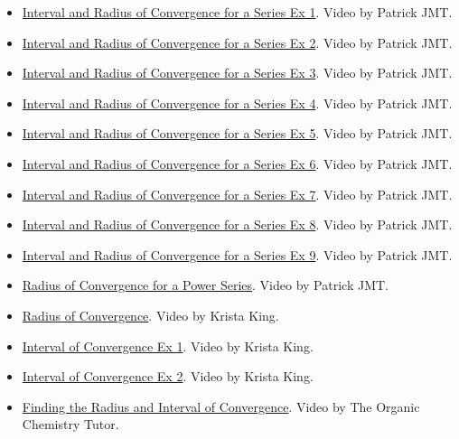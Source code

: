 \begin{itemize}

\item \href{https://www.youtube.com/watch?v=01LzAU__J-0}{Interval and Radius of Convergence for a Series Ex 1}. 
Video by Patrick JMT.

\item \href{https://www.youtube.com/watch?v=QQBtF7_KJrE}{Interval and Radius of Convergence for a Series Ex 2}. 
Video by Patrick JMT.

\item \href{https://www.youtube.com/watch?v=-gQ2E33V77o}{Interval and Radius of Convergence for a Series Ex 3}. 
Video by Patrick JMT.

\item \href{https://www.youtube.com/watch?v=AZeAZsK0sOw}{Interval and Radius of Convergence for a Series Ex 4}. 
Video by Patrick JMT.

\item \href{https://www.youtube.com/watch?v=uhNQ4X8hXoY}{Interval and Radius of Convergence for a Series Ex 5}. 
Video by Patrick JMT.

\item \href{https://www.youtube.com/watch?v=hLaJU2BLS2Y}{Interval and Radius of Convergence for a Series Ex 6}. 
Video by Patrick JMT.

\item \href{https://www.youtube.com/watch?v=ze54foaEUEQ}{Interval and Radius of Convergence for a Series Ex 7}. 
Video by Patrick JMT.

\item \href{https://www.youtube.com/watch?v=h4CNG3iAxKc}{Interval and Radius of Convergence for a Series Ex 8}. 
Video by Patrick JMT.

\item \href{https://www.youtube.com/watch?v=tcIKlExw-zA}{Interval and Radius of Convergence for a Series Ex 9}. 
Video by Patrick JMT.

\item \href{https://www.youtube.com/watch?v=MM3BXtVu9eM}{Radius of Convergence for a Power Series}. 
Video by Patrick JMT.

\item \href{https://www.youtube.com/watch?v=r8bK9j4vKco}{Radius of Convergence}. 
Video by Krista King.

\item \href{https://www.youtube.com/watch?v=deGN83_kzpc}{Interval of Convergence Ex 1}. 
Video by Krista King.

\item \href{https://www.youtube.com/watch?v=RWTri1aM7rM}{Interval of Convergence Ex 2}. 
Video by Krista King.

\item \href{https://www.youtube.com/watch?v=EGni2-m5yxM}{Finding the Radius and Interval of Convergence}. 
Video by The Organic Chemistry Tutor.

\end{itemize}

